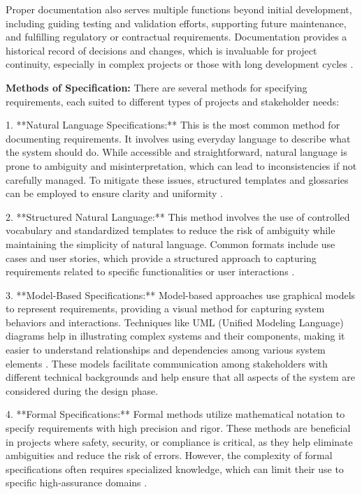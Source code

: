 \begin{refsection}
Proper documentation also serves multiple functions beyond initial development, including guiding testing and validation efforts, supporting future maintenance, and fulfilling regulatory or contractual requirements. Documentation provides a historical record of decisions and changes, which is invaluable for project continuity, especially in complex projects or those with long development cycles \cite[pp.~72-85]{pohl2010requirements}.

\textbf{Methods of Specification:} There are several methods for specifying requirements, each suited to different types of projects and stakeholder needs:

1. **Natural Language Specifications:** This is the most common method for documenting requirements. It involves using everyday language to describe what the system should do. While accessible and straightforward, natural language is prone to ambiguity and misinterpretation, which can lead to inconsistencies if not carefully managed. To mitigate these issues, structured templates and glossaries can be employed to ensure clarity and uniformity \cite[pp.~95-112]{hofmann2001requirements}.

2. **Structured Natural Language:** This method involves the use of controlled vocabulary and standardized templates to reduce the risk of ambiguity while maintaining the simplicity of natural language. Common formats include use cases and user stories, which provide a structured approach to capturing requirements related to specific functionalities or user interactions \cite[pp.~60-78]{hull2018requirements}.

3. **Model-Based Specifications:** Model-based approaches use graphical models to represent requirements, providing a visual method for capturing system behaviors and interactions. Techniques like UML (Unified Modeling Language) diagrams help in illustrating complex systems and their components, making it easier to understand relationships and dependencies among various system elements \cite[pp.~130-150]{booch2005unified}. These models facilitate communication among stakeholders with different technical backgrounds and help ensure that all aspects of the system are considered during the design phase.

4. **Formal Specifications:** Formal methods utilize mathematical notation to specify requirements with high precision and rigor. These methods are beneficial in projects where safety, security, or compliance is critical, as they help eliminate ambiguities and reduce the risk of errors. However, the complexity of formal specifications often requires specialized knowledge, which can limit their use to specific high-assurance domains \cite[pp.~145-168]{vliet2008software}.


\end{refsection}
